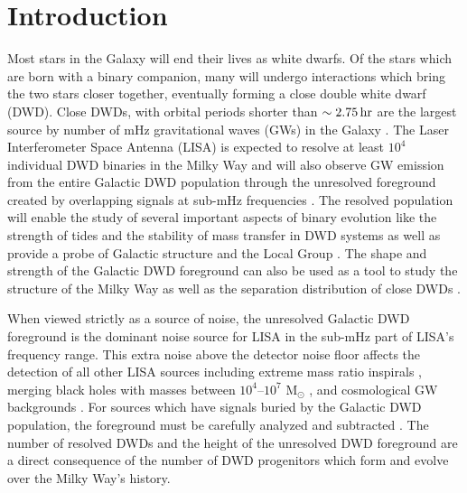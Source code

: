 \documentclass[twocolumn, linenumbers]{aastex631}
\begin{document}

\section{Introduction} \label{sec:intro}
Most stars in the Galaxy will end their lives as white dwarfs. Of the stars which are born with a binary companion, many will undergo interactions which bring the two stars closer together, eventually forming a close double white dwarf (DWD). Close DWDs, with orbital periods shorter than $\sim2.75\,\rm{hr}$ are the largest source by number of mHz gravitational waves (GWs) in the Galaxy \citep[e.g.,][]{LISAMissionProposal}. The Laser Interferometer Space Antenna (LISA) is expected to resolve at least $10^4$ individual DWD binaries in the Milky Way and will also observe GW emission from the entire Galactic DWD population through the unresolved foreground created by overlapping signals at sub-mHz frequencies \citep[e.g.,][]{Nelemans2001a, Ruiter2010, Nissanke2012, Yu2013, Korol2017, Lamberts2019, Breivik2020a}. The resolved population will enable the study of several important aspects of binary evolution like the strength of tides \citep{Valsecchi2012} and the stability of mass transfer in DWD systems \citep[e.g.,][]{Marsh2004, Shen2015, Gokhale2007, Sepinsky2014, Kremer2015} as well as provide a probe of Galactic structure \citep{Korol2019} and the Local Group \citep{Korol2018}. The shape and strength of the Galactic DWD foreground can also be used as a tool to study the structure of the Milky Way \citep{Benacquista2006, Breivik2020b} as well as the separation distribution of close DWDs \citep{Korol2021}.

When viewed strictly as a source of noise, the unresolved Galactic DWD foreground is the dominant noise source for LISA in the sub-mHz part of LISA's frequency range. This extra noise above the detector noise floor affects the detection of all other LISA sources including extreme mass ratio inspirals \citep[e.g.,][]{Berti2006, Barack2007, Babak2017, Moore2017}, merging black holes with masses between $10^4$--$10^7$ M$_{\odot}$ \citep[e.g.,][]{Klein2016, Bellovary2019}, and cosmological GW backgrounds \citep[e.g.,][]{Bartolo2016, Caprini2016, Caldwell2019}. For sources which have signals buried by the Galactic DWD population, the foreground must be carefully analyzed and subtracted \citep[][]{Adams2014,Cornish2020,Littenberg2020,Boileau2021}. The number of resolved DWDs and the height of the unresolved DWD foreground are a direct consequence of the number of DWD progenitors which form and evolve over the Milky Way's history. 
\end{document}
